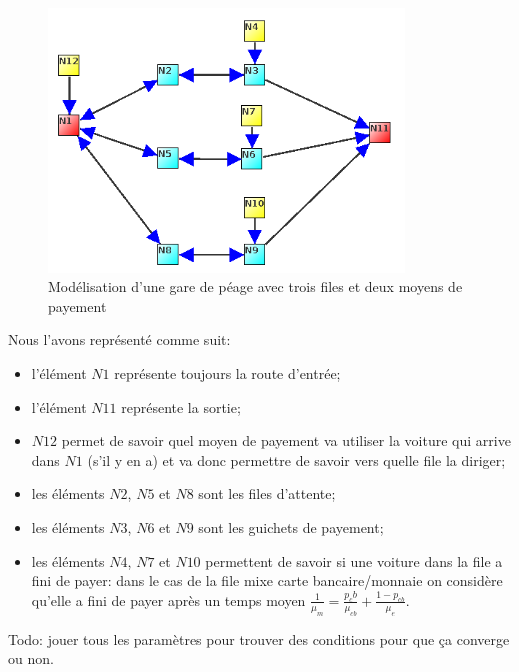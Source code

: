 \documentclass{scrartcl}
\begin{document}
      \begin{figure}[htbp]
        \centering
        \includegraphics[height=7cm]{img/3_files.png}
        \caption{Modélisation d'une gare de péage avec trois files et deux
          moyens de payement}
        \label{figure:syphilis_3_2}
      \end{figure}

      Nous l'avons représenté comme suit:
      \begin{itemize}
        \item l'élément $N1$ représente toujours la route d'entrée;
        \item l'élément $N11$ représente la sortie;
        \item $N12$ permet de savoir quel moyen de payement va utiliser la
          voiture qui arrive dans $N1$ (s'il y en a) et va donc permettre de
          savoir vers quelle file la diriger;
        \item les éléments $N2$, $N5$ et $N8$ sont les files d'attente;
        \item les éléments $N3$, $N6$ et $N9$ sont les guichets de payement;
        \item les éléments $N4$, $N7$ et $N10$ permettent de savoir si une
          voiture dans la file a fini de payer: dans le cas de la file mixe
          carte bancaire/monnaie on considère qu'elle a fini de payer après un
          temps moyen $\frac 1 {\mu_m} = \frac{p_cb}{\mu_{cb}} +
          \frac{1-p_{cb}}{\mu_e}$.
      \end{itemize}

      Todo: jouer tous les paramètres pour trouver des conditions pour que ça
      converge ou non.
\end{document}
